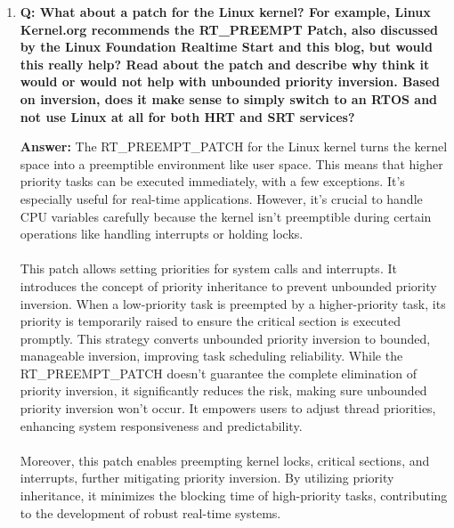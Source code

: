 \documentclass[a4paper,11pt]{article}%
\newenvironment{qanda}{\setlength{\parindent}{0pt}}{\bigskip}
\newcommand{\Q}{\bigskip\bfseries Q: }
\newcommand{\A}{\par\textbf{Answer: } \normalfont}
\begin{document}
\begin{qanda}
\begin{enumerate}
\begin{enumerate}
				\item \Q What about a patch for the Linux kernel? For example, Linux Kernel.org recommends
				      the RT\_PREEMPT Patch, also discussed by the Linux Foundation Realtime Start and this
				      blog, but would this really help? Read about the patch and describe why think it would
				      or would not help with unbounded priority inversion. Based on inversion, does it make
				      sense to simply switch to an RTOS and not use Linux at all for both HRT and SRT
				      services?
				      \A The RT\_PREEMPT\_PATCH for the Linux kernel turns the kernel space into a preemptible environment like user space. This means that higher priority tasks can be executed immediately, with a few exceptions. It's especially useful for real-time applications. However, it's crucial to handle CPU variables carefully because the kernel isn't preemptible during certain operations like handling interrupts or holding locks.\\\\
					  This patch allows setting priorities for system calls and interrupts. It introduces the concept of priority inheritance to prevent unbounded priority inversion. When a low-priority task is preempted by a higher-priority task, its priority is temporarily raised to ensure the critical section is executed promptly. This strategy converts unbounded priority inversion to bounded, manageable inversion, improving task scheduling reliability.
					  While the RT\_PREEMPT\_PATCH doesn't guarantee the complete elimination of priority inversion, it significantly reduces the risk, making sure unbounded priority inversion won't occur. It empowers users to adjust thread priorities, enhancing system responsiveness and predictability.\\\\
					  Moreover, this patch enables preempting kernel locks, critical sections, and interrupts, further mitigating priority inversion. By utilizing priority inheritance, it minimizes the blocking time of high-priority tasks, contributing to the development of robust real-time systems.\\\\
					  

\end{enumerate}
\end{enumerate}
\end{qanda}
\end{document}
